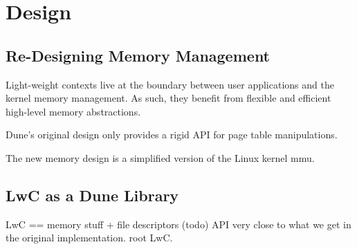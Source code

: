 \chapter{Design}

\section{Re-Designing Memory Management}
%
%

Light-weight contexts live at the boundary between user applications and the kernel memory management.
As such, they benefit from flexible and efficient high-level memory abstractions.


Dune's original design only provides a rigid API for page table manipulations.

The new memory design is a simplified version of the Linux kernel mmu.





\section{LwC as a Dune Library}
LwC == memory stuff + file descriptors (todo)
API
very close to what we get in the original implementation.
root LwC.



